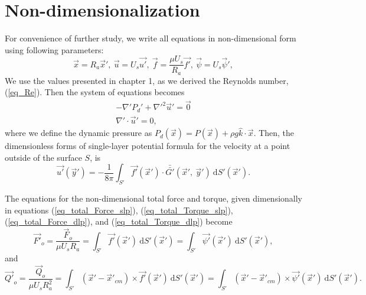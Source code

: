 \section{Non-dimensionalization}
For convenience of further study, we write all equations in non-dimensional form using following parameters:
\begin{equation}
\vec{x} = R_a\vec{x}', 
\
 \vec{u} = U_s \vec{u'},
 \
  \vec{f} = \frac{\mu U_s}{R_a} \vec{f'},
  \
  \vec{\psi} = U_s \vec{\psi}',
\label{eq_nonD}
\end{equation}
We use the values presented in chapter 1, as we derived the Reynolds number, (\ref{eq_Re}). 
Then the system of equations becomes
\begin{align}
    -\nabla' P_d' +  \nabla'^2 \vec{u}'  = \vec{0}
	\label{eq_momentum_noD}
	\\
    \nabla' \cdot \vec{u}' = 0,
	\label{eq_conti_noD}
\end{align}
where we define the dynamic pressure as 
$P_d(\vec{x}) =  P(\vec{x}) + \rho g \hat{k} \cdot \vec{x}$.
Then, the dimensionless forms of single-layer potential formula for the velocity at a point outside of the surface $S$, is 
\begin{equation}
    \vec{u'}(\vec{y}') =
	- \frac{1}{8 \pi}
	\int_{S'}  \vec{f'}(\vec{x}') \cdot \bar{\bar{G'}}(\vec{x}', \ \vec{y}') \ \text{d}S'(\vec{x}').
    \label{eq_single_nonD}
\end{equation}
\par
The equations for the non-dimensional total force and torque, given dimensionally in equations (\ref{eq_total_Force_slp}),  (\ref{eq_total_Torque_slp}),  (\ref{eq_total_Force_dlp}), and (\ref{eq_total_Torque_dlp})
become
\begin{equation}
 \vec{F'}_o = \frac{\vec{F}_o}{\mu U_s R_a} =
  \int_{S'} \vec{f'}(\vec{x}') \  \text{d}S'(\vec{x}')
 =\int_{S'}  \vec{\psi'}( \vec{x}') \ \text{d}S'(\vec{x}'),
 \label{eq_total_Force_noD}
 \end{equation} 
 and
 \begin{equation}
 \vec{Q'}_o = \frac{\vec{Q}_o}{\mu U_s R_a^2}
 = \int_{S'} (\vec{x}' - \vec{x}'_{cm}) \times \vec{f'}(\vec{x}')  \ \text{d}S' (\vec{x}')
 =  \int_{S'} (\vec{x}' - \vec{x}'_{cm}) \times \vec{\psi'}(\vec{x}') \ \text{d}S'(\vec{x}').
 \label{eq_total_Torque_noD}
 \end{equation}
